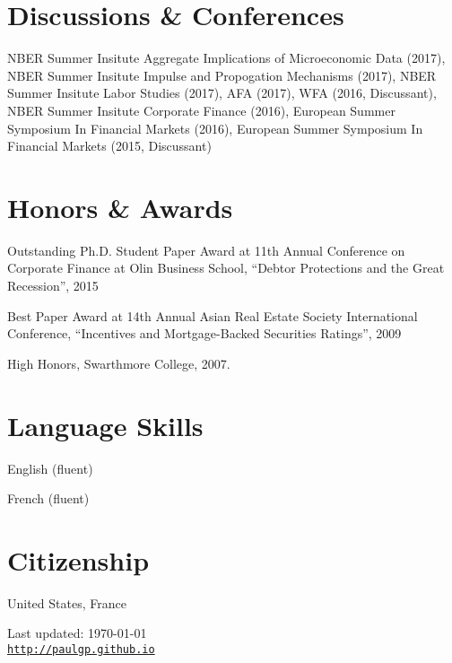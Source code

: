 \documentclass[letterpaper]{article}
\renewenvironment{itemize}{
  \begin{list}{}
    { \setlength{\itemsep}{5pt}
      \setlength{\parsep}{0pt}
      \setlength{\topsep}{0pt}
      \setlength{\leftmargin}{0em} } }{
  \end{list}}
\begin{document}
\section*{Discussions \& Conferences}
NBER Summer Insitute Aggregate Implications of Microeconomic Data (2017), NBER Summer Insitute Impulse and Propogation Mechanisms (2017), NBER Summer Insitute Labor Studies (2017), AFA (2017), WFA (2016, Discussant), NBER Summer Insitute Corporate Finance (2016), European Summer Symposium In Financial Markets (2016), European Summer Symposium In Financial Markets (2015, Discussant)

\section*{Honors \& Awards}
\begin{itemize}
\item Outstanding Ph.D. Student Paper Award at 11th Annual Conference
  on Corporate Finance at Olin Business School, ``Debtor Protections
  and the Great Recession'', 2015
\item Best Paper Award at 14th Annual Asian Real Estate Society
  International Conference, ``Incentives and Mortgage-Backed
  Securities Ratings'', 2009
\item High Honors, Swarthmore College, 2007.
\end{itemize}

\section*{Language Skills}
\begin{itemize}
\item English (fluent)
\item French (fluent)
\end{itemize}
\bigskip

\section*{Citizenship}
United States, France
\begin{center}
\begin{footnotesize}
Last updated: \today \\
\href{http://paulgp.github.io}{\tt http://paulgp.github.io}
\end{footnotesize}
\end{center}
\end{document}
